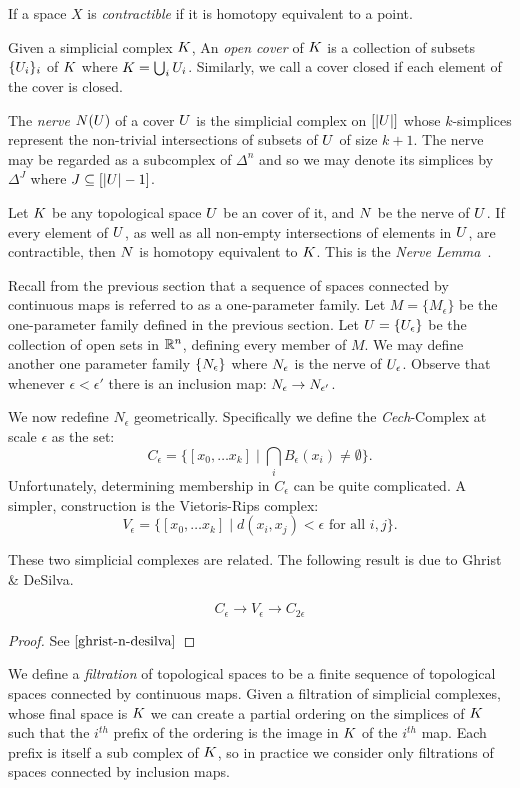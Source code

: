 If a space $X$ is \emph{contractible} if it is homotopy equivalent to a point.

Given a simplicial complex $K$, An \emph{open cover} of $K$ is a collection of subsets $\{U_i\}_i$ of $K$ where $K = \bigcup_i U_i$. Similarly, we call a cover closed if each element of the cover is closed.

The \emph{nerve} $N(U)$ of a cover $U$ is the simplicial complex on $[|U|]$ whose $k$-simplices represent the non-trivial intersections of subsets of $U$ of size $k+1$. The nerve may be regarded as a subcomplex of $\Delta^n$ and so we may denote its simplices by $\Delta^J$ where $J \subseteq [|U|-1]$.

Let $K$ be any topological space $U$ be an cover of it, and $N$ be the nerve of $U$. If every element of $U$, as well as all non-empty intersections of elements in $U$, are contractible, then $N$ is homotopy equivalent to $K$. This is the \emph{Nerve Lemma}~\cite{hatcher}.

Recall from the previous section that a sequence of spaces connected by continuous maps is referred to as a one-parameter family. Let $M = \{M_\epsilon\}$ be the one-parameter family defined in the previous section. Let $U = \{U_\epsilon\}$ be the collection of open sets in $\mathbb{R}^n$, defining every member of $M$. We may define another one parameter family $\{ N_\epsilon \}$ where $N_\epsilon$ is the nerve of $U_\epsilon$. Observe that whenever $\epsilon < \epsilon'$ there is an inclusion map: $N_\epsilon \rightarrow N_{\epsilon'}$.

We now redefine $N_{\epsilon}$ geometrically. Specifically we define the \emph{Cech}-Complex at scale $\epsilon$ as the set:
\[ C_\epsilon = \{ [ x_0, \ldots x_k] \mid \bigcap_i B_\epsilon(x_i)  \neq \emptyset \}. \]
Unfortunately, determining membership in $C_\epsilon$ can be quite complicated. A simpler, construction is the Vietoris-Rips complex:
\[ V_\epsilon = \{ [x_0, \ldots x_k] \mid d(x_i, x_j) < \epsilon \textrm{ for all } i,j  \}. \]

These two simplicial complexes are related. The following result is due to Ghrist \& DeSilva.
\begin{theorem}
\[ C_\epsilon \rightarrow V_\epsilon \rightarrow C_{2\epsilon} \]
\end{theorem}
\begin{proof}
See $\cite{ghrist-n-desilva}$
\end{proof}

We define a \emph{filtration} of topological spaces to be a finite sequence of topological spaces connected by
continuous maps. Given a filtration of simplicial complexes, whose final space is $K$ we can create a  
partial ordering on the simplices of $K$ such that the $i^{th}$ prefix of the ordering is the image in $K$ of the $i^{th}$ map. Each prefix is itself a sub complex of $K$, so in practice we consider only filtrations of spaces connected by inclusion maps.

